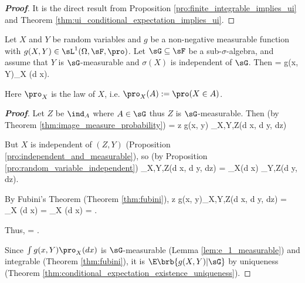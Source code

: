 \begin{proof}[\bf Proof]
It is the direct result from Proposition \ref{pro:finite_integrable_implies_ui} and Theorem \ref{thm:ui_conditional_expectation_implies_ui}. %
\end{proof}




\begin{proposition}
Let $X$ and $Y$ be random variables and $g$ be a non-negative measurable function with $g(X,Y)\in \sL^1(\Omega,\sF,\pro)$. Let $\sG \subseteq \sF$ be a sub-$\sigma$-algebra, and assume that $Y$ is $\sG$-measurable and $\sigma(X)$ is independent of $\sG$. Then
\be
\E[g(X, Y)|\sG] = \int g(x, Y)\pro_X (d x).
\ee

Here $\pro_X$ is the law of $X$, i.e. $\pro_X (A) := \pro(X \in A)$.
\end{proposition}

\begin{proof}[\bf Proof]
Let $Z$ be $\ind_A$ where $A\in \sG$ thus $Z$ is $\sG$-measurable. Then (by Theorem \ref{thm:image_measure_probability})
\be
\E{} = \int z g(x, y) \pro_{X,Y,Z}(d x, d y, dz)
\ee

But $X$ is independent of $(Z, Y)$ (Proposition \ref{pro:independent_and_measurable}), so (by Proposition \ref{pro:random_variable_independent})
\be
\pro_{X,Y,Z}(d x, d y, dz) = \pro_X(d x) \pro_{Y,Z}(d y, dz).
\ee

By Fubini's Theorem (Theorem \ref{thm:fubini}),
\beast
\int z g(x, y)\pro_{X,Y,Z}(d x, d y, dz) = \int {} \pro_X (d x) = \int \E{}\pro_X (d x) = \E {}.
\eeast

Thus,
\be
\E{} = \E {}.
\ee

Since $\int g(x, Y )\pro_X (d x)$ is $\sG$-measurable (Lemma \ref{lem:e_1_measurable}) and integrable (Theorem \ref{thm:fubini}), it is $\E\brb{g(X, Y ) |\sG}$ by uniqueness (Theorem \ref{thm:conditional_expectation_existence_uniqueness}).
\end{proof}




